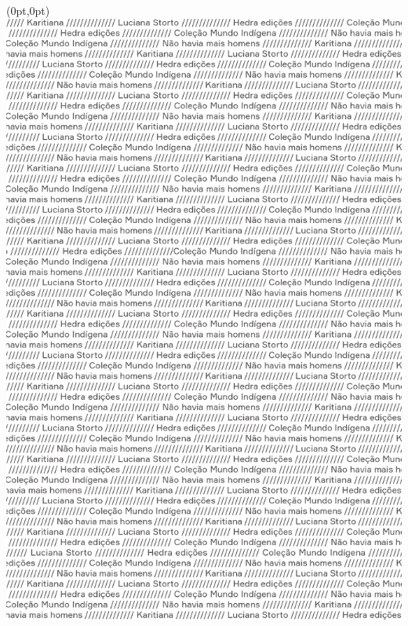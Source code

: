 \thispagestyle{empty}

\begin{textblock*}{-2in}(0pt,0pt)%
\vspace*{-2.4cm}
\hspace*{-3cm}\includegraphics[width=142mm]{./ABERTURA.png}  
\end{textblock*}

\pagebreak
\blankpage




